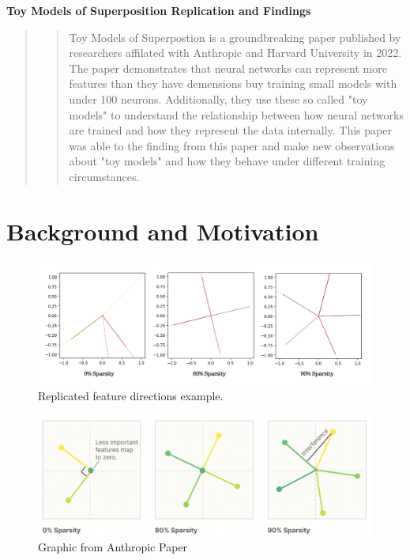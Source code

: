 \documentclass{article} %
\begin{document}


\noindent\makebox[\linewidth]{\rule{\textwidth}{1pt}} 
\vspace*{0mm} %
\begin{center}
    \Large\textbf{Toy Models of Superposition Replication and Findings}
\end{center}
\vspace*{2mm} %
\noindent\makebox[\linewidth]{\rule{\textwidth}{1pt}}
\newline

\begin{abstract}
\begin{quote}
    Toy Models of Superpostion\cite{elhage2022toy} is a groundbreaking paper published by 
    researchers affilated with Anthropic and Harvard University in 2022. The
    paper demonstrates that neural networks can represent more features than
    they have demensions buy training small models with under 100 neurons. Additionally,
    they use these so called "toy models" to understand the relationship between
    how neural networks are trained and how they represent the data internally.
    This paper was able to the finding from this paper and make new observations
    about "toy models" and how they behave under different training circumstances.
\end{quote}
\end{abstract}


\section{Background and Motivation}


\begin{figure}[h]
    \centering
    \includegraphics[width=0.7\linewidth]{section_1/images/section1_replicated_graphic.png}
    \caption{Replicated feature directions example.}
    \label{fig:section1_replication}
\end{figure}

\begin{figure}[h]
    \centering
    \includegraphics[width=0.67\linewidth]{section_1/images/section1_anthropic_graphic_.png}
    \caption{Graphic from Anthropic Paper}
    \label{fig:section1_anthropic}
\end{figure}
\end{document}
